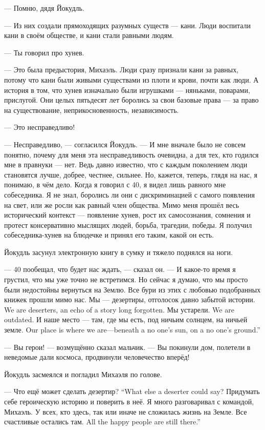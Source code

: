 --- Помню, дядя Йокудль.

--- Из них создали прямоходящих разумных существ --- кани.
Люди воспитали кани в своём обществе, и кани стали равными людям.

--- Ты говорил про хунев.

--- Это была предыстория, Михаэль.
Люди сразу признали кани за равных, потому что кани были живыми существами из плоти и крови, почти как люди.
А история в том, что хунев изначально были игрушками --- няньками, поварами, прислугой.
Они целых пятьдесят лет боролись за свои базовые права --- за право на существование, неприкосновенность, независимость.

--- Это несправедливо!

--- Несправедливо, --- согласился Йокудль.
--- И мне вначале было не совсем понятно, почему для меня эта несправедливость очевидна, а для тех, кто годился мне в правнуки --- нет.
Ведь давно известно, что с каждым поколением люди становятся лучше, добрее, честнее, сильнее.
Но, кажется, теперь, глядя на нас, я понимаю, в чём дело.
Когда я говорил с 40, я видел лишь равного мне собеседника.
Я не знал, боролись ли они с дискриминацией с самого появления на свет, или же росли как равный член общества.
Мимо меня прошёл весь исторический контекст --- появление хунев, рост их самосознания, сомнения и протест консервативно мыслящих людей, борьба, трагедии, победы.
Я получил собеседника-хунев на блюдечке и принял его таким, какой он есть.

Йокудль засунул электронную книгу в сумку и тяжело поднялся на ноги.

--- 40 пообещал, что будет нас ждать, --- сказал он.
--- И какое-то время я грустил, что мы уже точно не встретимся.
Но сейчас я думаю, что мы просто были недостойны вернуться на Землю.
Все бури из этих с любовью подобранных книжек прошли мимо нас.
{Мы --- дезертиры, отголосок давно забытой истории.}
{We are deserters, an echo of a story long forgotten.}
{Мы устарели.}
{We are outdated.}
{И наше место --- там, где мы есть, под ничьим солнцем, на ничьей земле.}
{Our place is where we are---beneath a no one's sun, on a no one's ground.''}

--- Вы герои! --- возмущённо сказал мальчик.
--- Вы покинули дом, полетели в неведомые дали космоса, продвинули человечество вперёд!

Йокудль засмеялся и погладил Михаэля по голове.

{--- Что ещё может сделать дезертир?}
{``What else a deserter could say?}
Придумать себе героическую историю и поверить в неё.
Я много разговаривал с командой, Михаэль.
У всех, кто здесь, так или иначе не сложилась жизнь на Земле.
{Все счастливые остались там.}
{All the happy people are still there.''}

